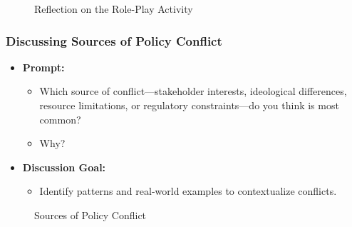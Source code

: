 \documentclass[10pt]{beamer}
\begin{document}
\begin{frame}
\begin{frame}
            \begin{figure}
                \centering
                \caption{Reflection on the Role-Play Activity}
            \end{figure}
            \end{frame}
            
            \begin{frame}
            \frametitle{Discussing Sources of Policy Conflict}
            \begin{itemize}
                \item \textbf{Prompt:}
                    \begin{itemize}
                        \item Which source of conflict—stakeholder interests, ideological differences, resource limitations, or regulatory constraints—do you think is most common?
                        \item Why?
                    \end{itemize}
                \item \textbf{Discussion Goal:}
                    \begin{itemize}
                        \item Identify patterns and real-world examples to contextualize conflicts.
                    \end{itemize}
            \end{itemize}
            
            \begin{figure}
                \centering
                \caption{Sources of Policy Conflict}
            \end{figure}
            \end{frame}
            

\end{frame}
\end{document}
